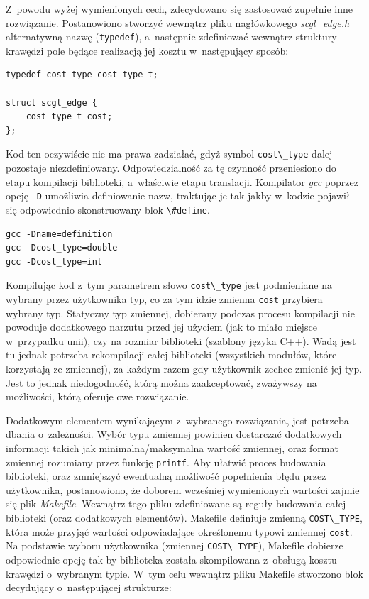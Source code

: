 \documentclass[a4paper,12pt,polish,oneside]{thesis}
\newcommand\code[1]{\lstinline[style=line]{#1}}
\begin{document}
Z~powodu wyżej wymienionych cech, zdecydowano się zastosować zupełnie inne rozwiązanie.
Postanowiono stworzyć wewnątrz pliku nagłówkowego \emph{scgl\_edge.h} alternatywną nazwę (\code{typedef}), a~następnie zdefiniować wewnątrz struktury krawędzi pole będące realizacją jej kosztu w~następujący sposób:
\begin{lstlisting}[style=code,caption=Koszt krawędzi w~bibliotece SCGL]
typedef cost_type cost_type_t;

struct scgl_edge {
	cost_type_t cost;
};
\end{lstlisting}
Kod ten oczywiście nie ma prawa zadziałać, gdyż symbol \code{cost\_type} dalej pozostaje niezdefiniowany.
Odpowiedzialność za tę czynność przeniesiono do etapu kompilacji biblioteki, a~właściwie etapu translacji.
Kompilator \emph{gcc} poprzez opcję \code{-D} umożliwia definiowanie nazw, traktując je tak jakby w~kodzie pojawił się odpowiednio skonstruowany blok \code{\#define}.
\begin{lstlisting}[style=coden]
gcc -Dname=definition
gcc -Dcost_type=double
gcc -Dcost_type=int
\end{lstlisting}
Kompilując kod z~tym parametrem słowo \code{cost\_type} jest podmieniane na wybrany przez użytkownika typ, co za tym idzie zmienna \code{cost} przybiera wybrany typ.
Statyczny typ zmiennej, dobierany podczas procesu kompilacji nie powoduje dodatkowego narzutu przed jej użyciem (jak to miało miejsce w~przypadku unii), czy na rozmiar biblioteki (szablony języka C++).
Wadą jest tu jednak potrzeba rekompilacji całej biblioteki (wszystkich modułów, które korzystają ze zmiennej), za każdym razem gdy użytkownik zechce zmienić jej typ.
Jest to jednak niedogodność, którą można zaakceptować, zważywszy na możliwości, którą oferuje owe rozwiązanie.

Dodatkowym elementem wynikającym z~wybranego rozwiązania, jest potrzeba dbania o~zależności.
Wybór typu zmiennej powinien dostarczać dodatkowych informacji takich jak minimalna/maksymalna wartość zmiennej, oraz format zmiennej rozumiany przez funkcję \code{printf}.
Aby ułatwić proces budowania biblioteki, oraz zmniejszyć ewentualną możliwość popełnienia błędu przez użytkownika, postanowiono, że doborem wcześniej wymienionych wartości zajmie się plik \emph{Makefile}.
Wewnątrz tego pliku zdefiniowane są reguły budowania całej biblioteki (oraz dodatkowych elementów).
Makefile definiuje zmienną \code{COST\_TYPE}, która może przyjąć wartości odpowiadające określonemu typowi zmiennej \code{cost}.
Na podstawie wyboru użytkownika (zmiennej \code{COST\_TYPE}), Makefile dobierze odpowiednie opcję tak by biblioteka została skompilowana z~obsługą kosztu krawędzi o~wybranym typie.
W~tym celu wewnątrz pliku Makefile stworzono blok decydujący o~następującej strukturze:
\end{document}

